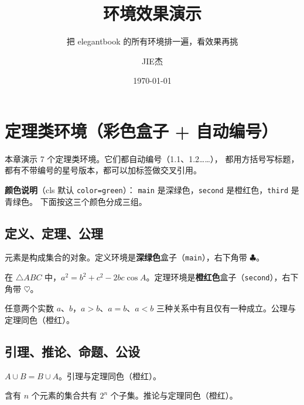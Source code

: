 \documentclass[lang=cn,newtx,10pt,scheme=chinese,nofont]{elegantbook}
\title{环境效果演示}
\subtitle{把 elegantbook 的所有环境排一遍，看效果再挑}
\author{JIE杰}
\institute{JIE杰}
\date{\today}
\begin{document}
\maketitle

\frontmatter
\tableofcontents

\mainmatter

\chapter{定理类环境（彩色盒子 + 自动编号）}

本章演示 7 个定理类环境。它们都自动编号（1.1、1.2……），
都用方括号写标题，都有不带编号的星号版本，都可以加标签做交叉引用。

\textbf{颜色说明}（cls 默认 \texttt{color=green}）：
\texttt{main} 是深绿色，\texttt{second} 是橙红色，\texttt{third} 是青绿色。
下面按这三个颜色分成三组。

\section{定义、定理、公理}

\begin{definition}[元素]
元素是构成集合的对象。定义环境是\textbf{深绿色}盒子（\texttt{main}），右下角带 $\clubsuit$。
\end{definition}

\begin{theorem}[余弦定理]
在 $\triangle ABC$ 中，$a^2=b^2+c^2-2bc\cos A$。定理环境是\textbf{橙红色}盒子（\texttt{second}），右下角带 $\heartsuit$。
\end{theorem}

\begin{axiom}[实数的有序性]
任意两个实数 $a$、$b$，$a>b$、$a=b$、$a<b$ 三种关系中有且仅有一种成立。公理与定理同色（橙红）。
\end{axiom}

\section{引理、推论、命题、公设}

\begin{lemma}[并集的性质]
$A \cup B=B \cup A$。引理与定理同色（橙红）。
\end{lemma}

\begin{corollary}[子集个数]
含有 $n$ 个元素的集合共有 $2^n$ 个子集。推论与定理同色（橙红）。
\end{corollary}
\end{document}

